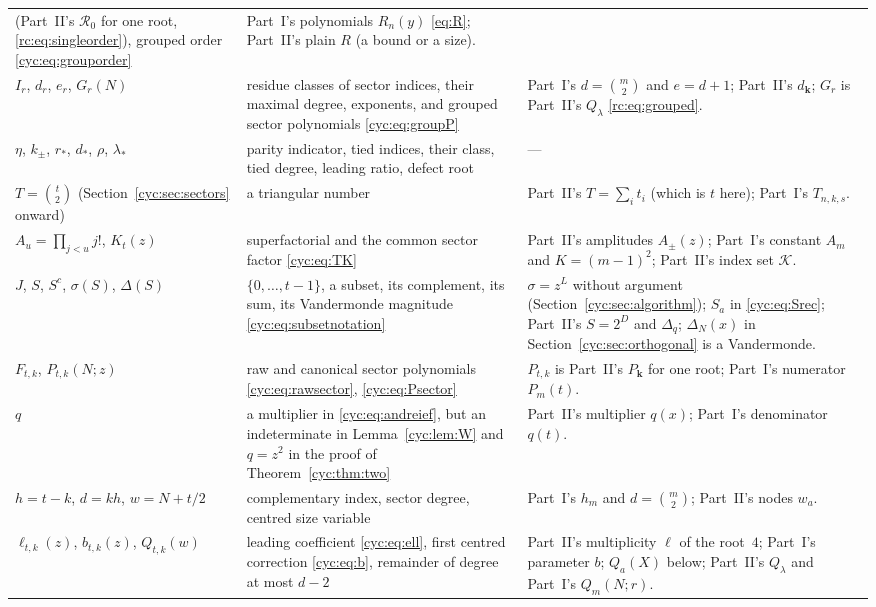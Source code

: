 \documentclass[11pt,a4paper]{article}
\numberwithin{equation}{section}
\theoremstyle{definition}
\theoremstyle{remark}
\newcommand{\bk}{\boldsymbol{k}}
\newcommand{\Rzero}{\mathcal R_0}
\begin{document}
\begin{longtable}{@{}>{\raggedright}p{}>{\raggedright}p{}>{\raggedright\arraybackslash}p{}@{}}
   (Part~II's $\Rzero$ for one root, \eqref{rc:eq:singleorder}), grouped
   order \eqref{cyc:eq:grouporder}
 & Part~I's polynomials $R_n(y)$ \eqref{eq:R}; Part~II's plain $R$ (a bound
   or a size).\\
$I_r$, $d_r$, $e_r$, $G_r(N)$
 & residue classes of sector indices, their maximal degree, exponents, and
   grouped sector polynomials \eqref{cyc:eq:groupP}
 & Part~I's $d=\binom m2$ and $e=d+1$; Part~II's $d_{\bk}$; $G_r$ is
   Part~II's $Q_\lambda$ \eqref{rc:eq:grouped}.\\
$\eta$, $k_\pm$, $r_*$, $d_*$, $\rho$, $\lambda_*$
 & parity indicator, tied indices, their class, tied degree, leading ratio,
   defect root
 & ---\\
$T=\binom t2$ (Section~\ref{cyc:sec:sectors} onward)
 & a triangular number
 & Part~II's $T=\sum_it_i$ (which is $t$ here); Part~I's $T_{n,k,s}$.\\
$A_u=\prod_{j<u}j!$, $K_t(z)$
 & superfactorial and the common sector factor \eqref{cyc:eq:TK}
 & Part~II's amplitudes $A_\pm(z)$; Part~I's constant $A_m$ and
   $K=(m-1)^2$; Part~II's index set $\mathcal K$.\\
$J$, $S$, $S^c$, $\sigma(S)$, $\Delta(S)$
 & $\{0,\ldots,t-1\}$, a subset, its complement, its sum, its Vandermonde
   magnitude \eqref{cyc:eq:subsetnotation}
 & $\sigma=z^L$ without argument (Section~\ref{cyc:sec:algorithm});
   $S_a$ in \eqref{cyc:eq:Srec}; Part~II's $S=2^D$ and $\Delta_q$;
   $\Delta_N(x)$ in Section~\ref{cyc:sec:orthogonal} is a Vandermonde.\\
$F_{t,k}$, $P_{t,k}(N;z)$
 & raw and canonical sector polynomials \eqref{cyc:eq:rawsector},
   \eqref{cyc:eq:Psector}
 & $P_{t,k}$ is Part~II's $P_{\bk}$ for one root; Part~I's numerator
   $P_m(t)$.\\
$q$
 & a multiplier in \eqref{cyc:eq:andreief}, but an indeterminate in
   Lemma~\ref{cyc:lem:W} and $q=z^2$ in the proof of
   Theorem~\ref{cyc:thm:two}
 & Part~II's multiplier $q(x)$; Part~I's denominator $q(t)$.\\
$h=t-k$, $d=kh$, $w=N+t/2$
 & complementary index, sector degree, centred size variable
 & Part~I's $h_m$ and $d=\binom m2$; Part~II's nodes $w_a$.\\
$\ell_{t,k}(z)$, $b_{t,k}(z)$, $Q_{t,k}(w)$
 & leading coefficient \eqref{cyc:eq:ell}, first centred correction
   \eqref{cyc:eq:b}, remainder of degree at most $d-2$
 & Part~II's multiplicity $\ell$ of the root~$4$; Part~I's parameter $b$;
   $Q_a(X)$ below; Part~II's $Q_\lambda$ and Part~I's $Q_m(N;r)$.\\

\end{longtable}
\end{document}
